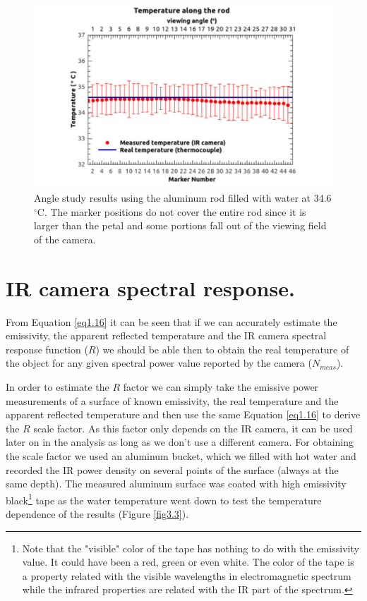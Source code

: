 		\begin{figure}[ht!]
			\centering
			\captionsetup{justification=centering,margin=0cm}
			\includegraphics[scale=0.5]{Figures/Chapter03/RodAngularTempResults.jpg}
			\caption{Angle study results using the aluminum rod filled with water at 34.6$^{\circ}$C. The marker positions do not cover the entire rod since it is larger than the petal and some portions fall out of the viewing field of the camera.}\label{fig3.2}
		\end{figure}\bigskip
	
	\section{IR camera spectral response.}\label{section3.3}
	
		From Equation \ref{eq1.16} it can be seen that if we can accurately estimate the emissivity, the apparent reflected temperature and the IR camera spectral response function ($R$) we should be able then to obtain the real temperature of the object for any given spectral power value reported by the camera ($N_{meas}$). 
		
		In order to estimate the $R$ factor we can simply take the emissive power measurements of a surface of known emissivity, the real temperature and the apparent reflected temperature and then use the same Equation \ref{eq1.16} to derive the $R$ scale factor. As this factor only depends on the IR camera, it can be used later on in the analysis as long as we don’t use a different camera.
		For obtaining the scale factor we used an aluminum bucket, which we filled with hot water and recorded the IR power density on several points of the surface (always at the same depth). The measured aluminum surface was coated with high emissivity black\footnote{{\footnotesize Note that the "visible" color of the tape has nothing to do with the emissivity value. It could have been a red, green or even white. The color of the tape is a property related with the visible wavelengths in electromagnetic spectrum while the infrared properties are related with the IR part of the spectrum.}} tape as the water temperature went down to test the temperature dependence of the results (Figure \ref{fig3.3}).
		
